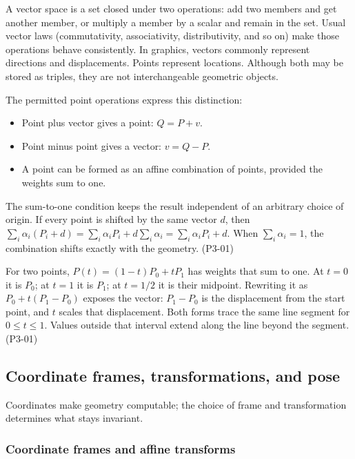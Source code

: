 A vector space is a set closed under two operations: add two members and get another member, or multiply a member by a scalar and remain in the set. Usual vector laws (commutativity, associativity, distributivity, and so on) make those operations behave consistently. In graphics, vectors commonly represent directions and displacements. Points represent locations. Although both may be stored as triples, they are not interchangeable geometric objects.

The permitted point operations express this distinction:

\begin{itemize}
\tightlist
\item
  Point plus vector gives a point: \(Q=P+v\).
\item
  Point minus point gives a vector: \(v=Q-P\).
\item
  A point can be formed as an affine combination of points, provided the weights sum to one.
\end{itemize}

The sum-to-one condition keeps the result independent of an arbitrary choice of origin. If every point is shifted by the same vector \(d\), then \(\sum_i\alpha_i(P_i+d)=\sum_i\alpha_iP_i+d\sum_i\alpha_i=\sum_i\alpha_iP_i+d\). When \(\sum_i\alpha_i=1\), the combination shifts exactly with the geometry. (P3-01)

For two points, \(P(t)=(1-t)P_0+tP_1\) has weights that sum to one. At \(t=0\) it is \(P_0\); at \(t=1\) it is \(P_1\); at \(t=1/2\) it is their midpoint. Rewriting it as \(P_0+t(P_1-P_0)\) exposes the vector: \(P_1-P_0\) is the displacement from the start point, and \(t\) scales that displacement. Both forms trace the same line segment for \(0\leq t\leq1\). Values outside that interval extend along the line beyond the segment. (P3-01)

\subsection{Coordinate frames, transformations, and pose}\label{03-visual-computing-i-ch001-coordinate-frames-transformations-and-pose}

\hypertarget{03-visual-computing-i-ch001-coordinate-frames-transformations-and-pose}{}

Coordinates make geometry computable; the choice of frame and transformation determines what stays invariant.

\subsubsection{Coordinate frames and affine transforms}\label{03-visual-computing-i-ch001-coordinate-frames-and-affine-transforms}

